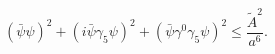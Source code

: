\begin{equation}
  (\bar{\psi}\psi)^2+(i\bar{\psi}\gamma_5\psi)^2+
  (\bar{\psi}\gamma^0\gamma_5\psi)^2\leq
  \frac{\tilde{A}^2}{a^6}.
\end{equation}

